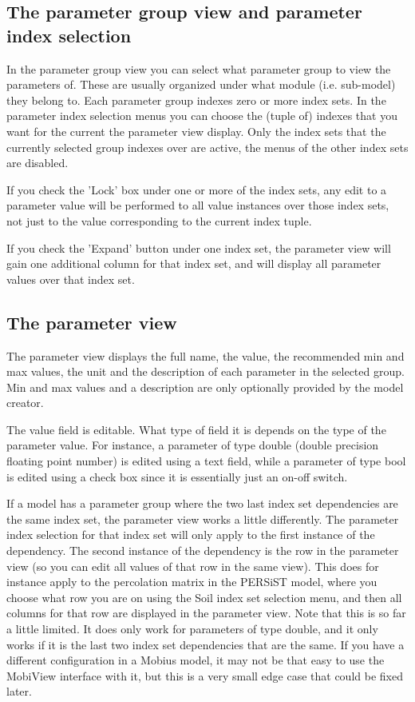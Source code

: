 \documentclass[11pt]{article}
\theoremstyle{definition}
\begin{document}
\subsection{The parameter group view and parameter index selection}

In the parameter group view you can select what parameter group to view the parameters of. These are usually organized under what module (i.e. sub-model) they belong to. Each parameter group indexes zero or more index sets. In the parameter index selection menus you can choose the (tuple of) indexes that you want for the current the parameter view display. Only the index sets that the currently selected group indexes over are active, the menus of the other index sets are disabled.

If you check the 'Lock' box under one or more of the index sets, any edit to a parameter value will be performed to all value instances over those index sets, not just to the value corresponding to the current index tuple.

If you check the 'Expand' button under one index set, the parameter view will gain one additional column for that index set, and will display all parameter values over that index set.

\subsection{The parameter view}

The parameter view displays the full name, the value, the recommended min and max values, the unit and the description of each parameter in the selected group. Min and max values and a description are only optionally provided by the model creator.

The value field is editable. What type of field it is depends on the type of the parameter value. For instance, a parameter of type double (double precision floating point number) is edited using a text field, while a parameter of type bool is edited using a check box since it is essentially just an on-off switch.

If a model has a parameter group where the two last index set dependencies are the same index set, the parameter view works a little differently. The parameter index selection for that index set will only apply to the first instance of the dependency. The second instance of the dependency is the row in the parameter view (so you can edit all values of that row in the same view). This does for instance apply to the percolation matrix in the PERSiST model, where you choose what row you are on using the Soil index set selection menu, and then all columns for that row are displayed in the parameter view. Note that this is so far a little limited. It does only work for parameters of type double, and it only works if it is the last two index set dependencies that are the same. If you have a different configuration in a Mobius model, it may not be that easy to use the MobiView interface with it, but this is a very small edge case that could be fixed later.
\end{document}

